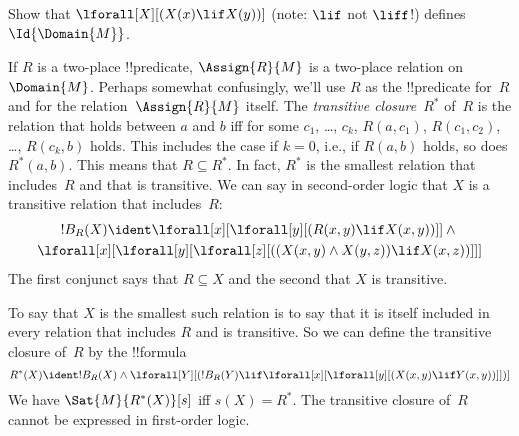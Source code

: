 \documentclass[../../../include/open-logic-section]{subfiles}
\begin{document}
\begin{prob}
Show that $\lforall[X][(X(x) \lif X(y))]$ (note:
$\lif$ not $\liff$!) defines $\Id{\Domain{M}}$.
\end{prob}

\begin{ex}
If $R$ is a two-place !!{predicate}, $\Assign{R}{M}$ is a two-place
relation on~$\Domain{M}$.  Perhaps somewhat confusingly, we'll use $R$
as the !!{predicate} for~$R$ and for the relation~$\Assign{R}{M}$
itself.  The \emph{transitive closure}~$R^*$ of~$R$ is the relation
that holds between $a$ and $b$ iff for some $c_1$, \dots, $c_k$,
$R(a,c_1)$, $R(c_1, c_2)$, \dots, $R(c_k,b)$ holds. This includes the
case if $k = 0$, i.e., if $R(a,b)$ holds, so does $R^*(a,b)$. This
means that $R \subseteq R^*$. In fact, $R^*$ is the smallest relation
that includes~$R$ and that is transitive.  We can say in second-order
logic that $X$ is a transitive relation that includes~$R$:
\begin{multline*}
  !B_R(X) \ident \lforall[x][\lforall[y][(R(x,y) \lif X(x, y))]] \land {}\\
\lforall[x][\lforall[y][\lforall[z][((X(x,y) \land X(y,z)) \lif X(x,
      z))]]]
\end{multline*}
The first conjunct says that $R \subseteq X$ and the second
that $X$ is transitive.

To say that $X$ is the smallest such relation is to say that it is
itself included in every relation that includes $R$ and is
transitive. So we can define the transitive closure of~$R$ by the
!!{formula}
\[
R^*(X) \ident !B_R(X) \land \lforall[Y][(!B_R(Y) \lif
  \lforall[x][\lforall[y][(X(x, y) \lif Y(x,y))]])]
\]
We have $\Sat{M}{R^*(X)}[s]$ iff $s(X) = R^*$. The transitive closure
of~$R$ cannot be expressed in first-order logic.
\end{ex}
\end{document}

